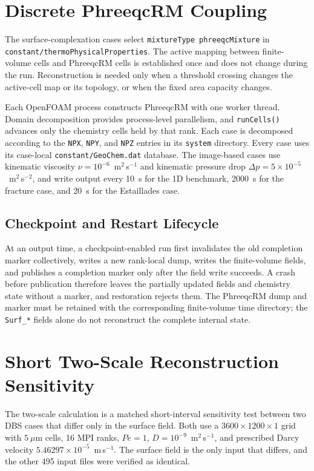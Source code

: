 \documentclass[pdflatex,sn-basic]{sn-jnl}
\begin{document}
\section{Discrete PhreeqcRM Coupling}

The surface-complexation cases select \texttt{mixtureType phreeqcMixture} in
\texttt{constant/thermoPhysicalProperties}. The active mapping between
finite-volume cells and PhreeqcRM cells is established once and does not change
during the run. Reconstruction is needed only when a threshold crossing changes
the active-cell map or its topology, or when the fixed area capacity changes.

Each OpenFOAM process constructs PhreeqcRM with one worker thread. Domain
decomposition provides process-level parallelism, and \texttt{runCells()}
advances only the chemistry cells held by that rank. Each case is decomposed
according to the \texttt{NPX}, \texttt{NPY}, and \texttt{NPZ} entries in its
\texttt{system} directory. Every case uses its case-local
\texttt{constant/GeoChem.dat} database. The image-based cases use kinematic
viscosity $\nu = 10^{-6}$~m$^2$\,s$^{-1}$ and kinematic pressure drop
$\Delta p = 5\times10^{-5}$~m$^2$\,s$^{-2}$, and write output every 10~s for the 1D
benchmark, 2000~s for the fracture case, and 20~s for the Estaillades case.

\subsection{Checkpoint and Restart Lifecycle}

At an output time, a checkpoint-enabled run first invalidates the old
completion marker collectively, writes a new rank-local dump, writes the
finite-volume fields, and publishes a completion marker only after the field
write succeeds. A crash before publication therefore leaves the partially
updated fields and chemistry state without a marker, and restoration rejects
them. The PhreeqcRM dump and marker must be retained with the corresponding
finite-volume time directory; the \texttt{Surf\_*} fields alone do not
reconstruct the complete internal state.

\section{Short Two-Scale Reconstruction Sensitivity}

The two-scale calculation is a matched short-interval sensitivity test between
two DBS cases that differ only in the surface field. Both use a
$3600\times1200\times1$ grid with $5~\mu$m cells,
16 MPI ranks, $Pe=1$, $D=10^{-9}$~m$^2$\,s$^{-1}$, and prescribed Darcy velocity
$5.46297\times10^{-5}$~m\,s$^{-1}$. The surface field is the only input that
differs, and the other 495 input files were verified as identical.
\end{document}
